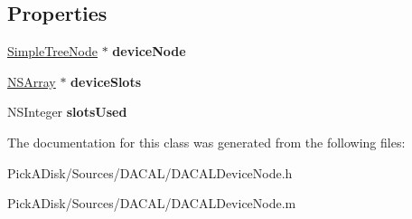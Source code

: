 \subsection*{Properties}
\begin{DoxyCompactItemize}
\item 
\hypertarget{interface_d_a_c_a_l_device_node_a8989cb3235d0eeb596546db4e9bcf3fd}{
\hyperlink{class_simple_tree_node}{SimpleTreeNode} $\ast$ {\bfseries deviceNode}}
\label{interface_d_a_c_a_l_device_node_a8989cb3235d0eeb596546db4e9bcf3fd}

\item 
\hypertarget{interface_d_a_c_a_l_device_node_a10c958d1a16ec253c483780a75709f64}{
\hyperlink{class_n_s_array}{NSArray} $\ast$ {\bfseries deviceSlots}}
\label{interface_d_a_c_a_l_device_node_a10c958d1a16ec253c483780a75709f64}

\item 
\hypertarget{interface_d_a_c_a_l_device_node_aad3f4e23114854c9375e9fa563dc1901}{
NSInteger {\bfseries slotsUsed}}
\label{interface_d_a_c_a_l_device_node_aad3f4e23114854c9375e9fa563dc1901}

\end{DoxyCompactItemize}


The documentation for this class was generated from the following files:\begin{DoxyCompactItemize}
\item 
PickADisk/Sources/DACAL/DACALDeviceNode.h\item 
PickADisk/Sources/DACAL/DACALDeviceNode.m\end{DoxyCompactItemize}
